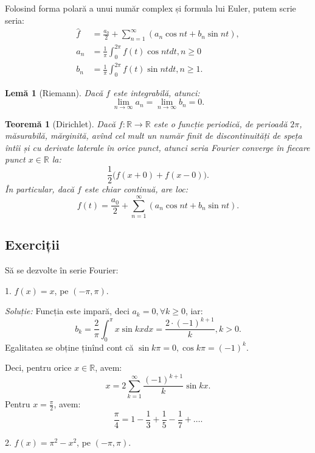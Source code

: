 \documentclass[11pt,a4paper]{article}
\newcommand\RR{\mathbb{R}}
\theoremstyle{dotless}
\newtheorem{theorem}{Teorem\u{a}}[section]
\newtheorem{lemma}{Lem\u{a}}[section]
\theoremstyle{dotlessdr}
\begin{document}
Folosind forma polară a unui număr complex și formula lui Euler, putem scrie seria:
\begin{align*}
  \widehat{f} &= \frac{a_0}{2} + \sum_{n = 1}^\infty (a_n \cos nt + b_n \sin nt), \\
  a_n &= \frac{1}{\pi} \int_0^{2\pi} f(t) \cos nt dt, n \geq 0 \\
  b_n &= \frac{1}{\pi} \int_0^{2\pi} f(t) \sin nt dt, n \geq 1.
\end{align*}

\begin{lemma}[Riemann]\label{le:riemann-fourier}
  Dacă $f$ este integrabilă, atunci:
  \[
    \lim_{n \to \infty} a_n = \lim_{n \to \infty} b_n = 0.
  \]
\end{lemma}

\begin{theorem}[Dirichlet]\label{thm:dirichlet-fourier}
  Dacă $f : \RR \to \RR$ este o funcție periodică, de perioadă $2\pi$, măsurabilă,
  mărginită, avînd cel mult un număr finit de discontinuități de speța întîi și cu
  derivate laterale în orice punct, atunci seria Fourier converge în fiecare punct
  $x \in \RR$ la:
  \[
    \frac{1}{2} \big( f(x + 0) + f(x - 0) \big).
  \]
  În particular, dacă $f$ este chiar continuă, are loc:
  \[
    f(t) = \frac{a_0}{2} + \sum_{n = 1}^\infty (a_n \cos nt + b_n \sin nt).
  \]
\end{theorem}



\subsection{Exerciții}

Să se dezvolte în serie Fourier:

1. $f(x) = x$, pe $(-\pi, \pi)$.

\emph{Soluție:} Funcția este impară, deci $a_k = 0, \forall k \geq 0$, iar:
\[
  b_k = \frac{2}{\pi} \int_0^\pi x \sin kx dx =
  \frac{2 \cdot (-1)^{k+1}}{k}, k > 0.
\]
Egalitatea se obține ținînd cont că $\sin k \pi = 0, \cos k\pi = (-1)^k$.

Deci, pentru orice $x \in \RR$, avem:
\[
  x = 2 \sum_{k = 1}^\infty \frac{(-1)^{k + 1}}{k} \sin kx.
\]
Pentru $x = \frac{\pi}{2}$, avem:
\[
  \frac{\pi}{4} = 1 - \frac{1}{3} + \frac{1}{5} - \frac{1}{7} + \dots.
\]

\vspace{1cm}

2. $f(x) = \pi^2 - x^2$, pe $(-\pi, \pi)$.
\end{document}
